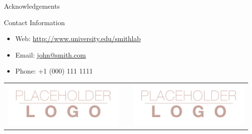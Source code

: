 \documentclass[final]{beamer}
\newlength{\onecolwid}
\begin{document}
\begin{frame}[t]
\begin{columns}[t]
\begin{column}{\onecolwid}
\begin{block}{Acknowledgements}
\end{block}



\begin{alertblock}{Contact Information}

\begin{itemize}
\item Web: \href{http://www.university.edu/smithlab}{http://www.university.edu/smithlab}
\item Email: \href{mailto:john@smith.com}{john@smith.com}
\item Phone: +1 (000) 111 1111
\end{itemize}

\end{alertblock}

\begin{center}
\begin{tabular}{ccc}
\includegraphics[width=0.4\linewidth]{logo.png} & \hfill & \includegraphics[width=0.4\linewidth]{logo.png}
\end{tabular}
\end{center}


\end{column} %

\end{columns} %

\end{frame} %
\end{document}
